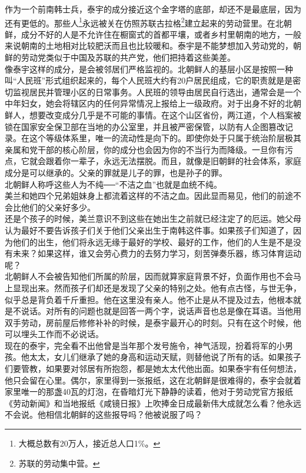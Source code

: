 作为一个前南韩士兵，泰宇的成分接近这个金字塔的底部，却还不是最底层，因为还有更低的。那些人\footnote{大概总数有20万人，接近总人口1\%。}永远被关在仿照苏联古拉格\footnote{苏联的劳动集中营。}建立起来的劳动营里。在北朝鲜，成分不好的人是不允许住在橱窗式的首都平壤，或者乡村里朝南的地方，一般来说朝南的土地相对比较肥沃而且也比较暖和。泰宇是不能梦想加入劳动党的，朝鲜的劳动党类似于中国及苏联的共产党，他们把持着这些美差。\\

像泰宇这样的成分，是会被邻居们严格监视的。北朝鲜人的基层小区是按照一种叫“人民班”形式组织起来的，每个人民班大约有20户居民组成，它的职责就是是密切监视居民并管理小区的日常事务。人民班的领导由居民自行选出，通常会是一个中年妇女，她会将辖区内的任何异常情况上报给上一级政府。对于出身不好的北朝鲜人，想要改变成分几乎是不可能的事情。在这个山区省份，两江道，个人档案被锁在国家安全保卫部在当地的办公室里，并且被严密保管，以防有人企图篡改记录。在这个等级体系里，唯一的流动性是向下的。即使你处于只属于统治阶层极其亲属和党干部的核心阶层，你的成分也会因为你的不当行为而降级。一旦你有污点，它就会跟着你一辈子，永远无法摆脱。而且，就像是旧朝鲜的社会体系，家庭成分是可以继承的。父亲的罪就是儿子的罪，也是孙子的罪。\\

北朝鲜人称呼这些人为不纯──“不洁之血”也就是血统不纯。\\

美兰和她四个兄弟姐妹身上都流着这样的不洁之血。因此显而易见，他们的前途不会比他们的父亲好多少。\\

还是个孩子的时候，美兰意识不到这些在她出生之前就已经注定了的厄运。她父母认为最好不要告诉孩子们关于他们父亲出生于南韩这件事。如果孩子们知道了，因为他们的出生，他们将永远无缘于最好的学校、最好的工作，他们的人生是不是没有未来？如果这样，谁又会劳心费力的去努力学习，刻苦弹奏乐器，练习体育运动呢？\\

北朝鲜人不会被告知他们所属的阶层，因而就算家庭背景不好，负面作用也不会马上显现出来。然而孩子们却还是发现了父亲的特别之处。他有点古怪，与世无争，似乎总是背负着千斤重担。他在这里没有亲人。他不止是从不提及过去，他根本就是不说话。对所有的问题也就是回答一两个字，说话声音也总是像在耳语。当他用双手劳动，房前屋后修修补补的时候，是泰宇最开心的时刻。只有在这个时候，他可以埋头工作而不必说话。\\

现在的泰宇，完全看不出他曾是当年那个发号施令，神气活现，扮着将军的小男孩。他太太，女儿们继承了她的身高和运动天赋，则替他说了所有的话。如果孩子们要管教，如果要对邻居有所抱怨，都是她太太代他出面。如果泰宇有任何想法，他只会留在心里。偶尔，家里得到一张报纸，这在北朝鲜是很难得的，泰宇会就着家里唯一的那盏40瓦的灯泡，在昏暗灯光下静静的读着，他对于劳动党官方报纸《劳动新闻》和当地报纸《咸镜日报》上吹捧金日成最新伟大成就怎么看？他永远不会说。他相信北朝鲜的这些报导吗？他被说服了吗？\\

